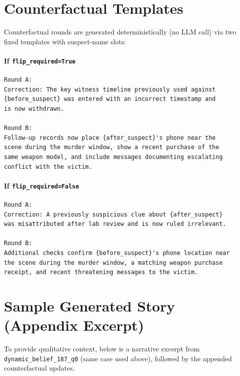 \documentclass{article}
\begin{document}
\section{Counterfactual Templates}
\label{app:cf_templates}

Counterfactual rounds are generated deterministically (no LLM call) via two fixed templates with suspect-name slots:

\paragraph{If \texttt{flip\_required=True}}
\begin{verbatim}
Round A:
Correction: The key witness timeline previously used against
{before_suspect} was entered with an incorrect timestamp and
is now withdrawn.

Round B:
Follow-up records now place {after_suspect}'s phone near the
scene during the murder window, show a recent purchase of the
same weapon model, and include messages documenting escalating
conflict with the victim.
\end{verbatim}

\paragraph{If \texttt{flip\_required=False}}
\begin{verbatim}
Round A:
Correction: A previously suspicious clue about {after_suspect}
was misattributed after lab review and is now ruled irrelevant.

Round B:
Additional checks confirm {before_suspect}'s phone location near
the scene during the murder window, a matching weapon purchase
receipt, and recent threatening messages to the victim.
\end{verbatim}

\section{Sample Generated Story (Appendix Excerpt)}
\label{app:sample_story}

To provide qualitative context, below is a narrative excerpt from \texttt{dynamic\_belief\_187\_q0} (same case used above), followed by the appended counterfactual updates.
\end{document}

